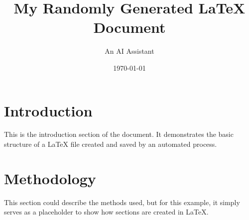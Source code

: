 \documentclass{article}
\title{My Randomly Generated LaTeX Document}
\author{An AI Assistant}
\date{\today}
\begin{document}
\maketitle

\section{Introduction}
This is the introduction section of the document. It demonstrates the basic structure of a LaTeX file created and saved by an automated process.

\section{Methodology}
This section could describe the methods used, but for this example, it simply serves as a placeholder to show how sections are created in LaTeX.
\end{document}

